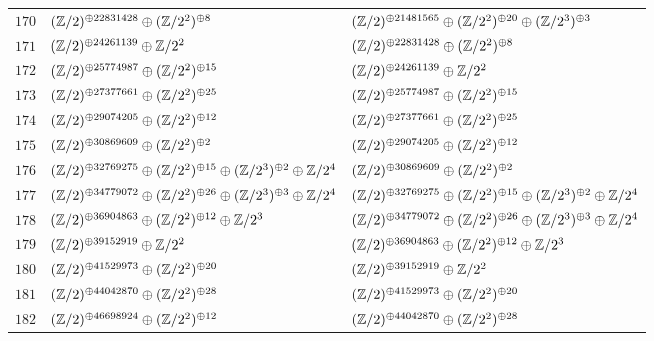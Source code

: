 \begin{supertabular}{|c|p{5.5cm}|p{5.5cm}|}
$170$%
&$(\mathbb{Z}/2)^{\oplus22831428}\oplus(\mathbb{Z}/2^{2})^{\oplus8}$%
&$(\mathbb{Z}/2)^{\oplus21481565}\oplus(\mathbb{Z}/2^{2})^{\oplus20}\oplus(\mathbb{Z}/2^{3})^{\oplus3}$\\

$171$%
&$(\mathbb{Z}/2)^{\oplus24261139}\oplus\mathbb{Z}/2^{2}$%
&$(\mathbb{Z}/2)^{\oplus22831428}\oplus(\mathbb{Z}/2^{2})^{\oplus8}$\\

$172$%
&$(\mathbb{Z}/2)^{\oplus25774987}\oplus(\mathbb{Z}/2^{2})^{\oplus15}$%
&$(\mathbb{Z}/2)^{\oplus24261139}\oplus\mathbb{Z}/2^{2}$\\

$173$%
&$(\mathbb{Z}/2)^{\oplus27377661}\oplus(\mathbb{Z}/2^{2})^{\oplus25}$%
&$(\mathbb{Z}/2)^{\oplus25774987}\oplus(\mathbb{Z}/2^{2})^{\oplus15}$\\

$174$%
&$(\mathbb{Z}/2)^{\oplus29074205}\oplus(\mathbb{Z}/2^{2})^{\oplus12}$%
&$(\mathbb{Z}/2)^{\oplus27377661}\oplus(\mathbb{Z}/2^{2})^{\oplus25}$\\

$175$%
&$(\mathbb{Z}/2)^{\oplus30869609}\oplus(\mathbb{Z}/2^{2})^{\oplus2}$%
&$(\mathbb{Z}/2)^{\oplus29074205}\oplus(\mathbb{Z}/2^{2})^{\oplus12}$\\

$176$%
&$(\mathbb{Z}/2)^{\oplus32769275}\oplus(\mathbb{Z}/2^{2})^{\oplus15}\oplus(\mathbb{Z}/2^{3})^{\oplus2}\oplus\mathbb{Z}/2^{4}$%
&$(\mathbb{Z}/2)^{\oplus30869609}\oplus(\mathbb{Z}/2^{2})^{\oplus2}$\\

$177$%
&$(\mathbb{Z}/2)^{\oplus34779072}\oplus(\mathbb{Z}/2^{2})^{\oplus26}\oplus(\mathbb{Z}/2^{3})^{\oplus3}\oplus\mathbb{Z}/2^{4}$%
&$(\mathbb{Z}/2)^{\oplus32769275}\oplus(\mathbb{Z}/2^{2})^{\oplus15}\oplus(\mathbb{Z}/2^{3})^{\oplus2}\oplus\mathbb{Z}/2^{4}$\\

$178$%
&$(\mathbb{Z}/2)^{\oplus36904863}\oplus(\mathbb{Z}/2^{2})^{\oplus12}\oplus\mathbb{Z}/2^{3}$%
&$(\mathbb{Z}/2)^{\oplus34779072}\oplus(\mathbb{Z}/2^{2})^{\oplus26}\oplus(\mathbb{Z}/2^{3})^{\oplus3}\oplus\mathbb{Z}/2^{4}$\\

$179$%
&$(\mathbb{Z}/2)^{\oplus39152919}\oplus\mathbb{Z}/2^{2}$%
&$(\mathbb{Z}/2)^{\oplus36904863}\oplus(\mathbb{Z}/2^{2})^{\oplus12}\oplus\mathbb{Z}/2^{3}$\\

$180$%
&$(\mathbb{Z}/2)^{\oplus41529973}\oplus(\mathbb{Z}/2^{2})^{\oplus20}$%
&$(\mathbb{Z}/2)^{\oplus39152919}\oplus\mathbb{Z}/2^{2}$\\

$181$%
&$(\mathbb{Z}/2)^{\oplus44042870}\oplus(\mathbb{Z}/2^{2})^{\oplus28}$%
&$(\mathbb{Z}/2)^{\oplus41529973}\oplus(\mathbb{Z}/2^{2})^{\oplus20}$\\

$182$%
&$(\mathbb{Z}/2)^{\oplus46698924}\oplus(\mathbb{Z}/2^{2})^{\oplus12}$%
&$(\mathbb{Z}/2)^{\oplus44042870}\oplus(\mathbb{Z}/2^{2})^{\oplus28}$\\


\end{supertabular}
